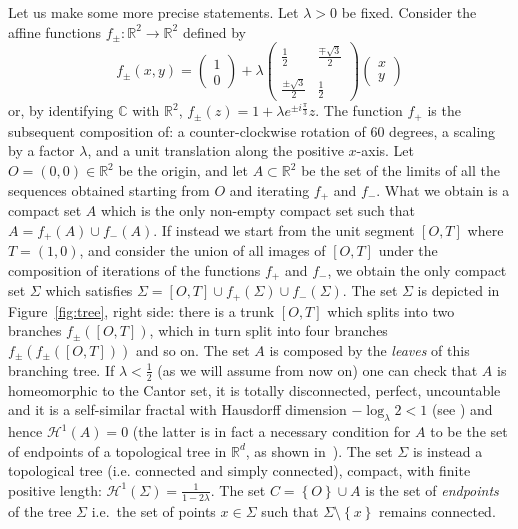 \documentclass{amsart}
\newcommand{\RR}{\mathbb R}
\newcommand{\CC}{\mathbb C}
\renewcommand{\H}{\mathcal H}
\newcommand{\ENCLOSE}[1]{\left\{#1\right\}}
\renewcommand{\H}{\mathcal{H}}
\theoremstyle{definition}
\theoremstyle{remark}
\begin{document}
Let us make some more precise statements.
Let $\lambda>0$ be fixed.
Consider the affine functions $f_\pm\colon \RR^2\to \RR^2$ defined by
\[
  f_\pm(x,y) = \begin{pmatrix} 1 \\ 0 \end{pmatrix} 
    + \lambda \begin{pmatrix} 
        \frac 1 2 & \frac{\mp\sqrt 3}{2} \\\\ 
        \frac{\pm\sqrt 3}{2} & \frac 1 2 
      \end{pmatrix} \begin{pmatrix} x \\ y \end{pmatrix}
\]
or, by identifying $\CC$ with $\RR^2$,
$f_\pm(z) = 1 + \lambda e^{\pm i \frac \pi 3} z$.
The function $f_+$ is the subsequent composition of: a counter-clockwise rotation of $60$ degrees,
a scaling by a factor $\lambda$, and a unit translation along the positive $x$-axis.
Let $O=(0,0)\in \RR^2$ be the origin, and let $A\subset \RR^2$ be the set of 
the limits of all the sequences obtained starting from $O$ and 
iterating $f_+$ and $f_-$.
What we obtain is a compact set $A$ which is the only non-empty compact set 
such that $A=f_+(A)\cup f_-(A)$.
If instead we start from the unit segment $[O,T]$ where $T=(1,0)$, and 
consider the union of all images of $[O,T]$ under the composition of iterations of the 
functions $f_+$ and $f_-$, we obtain the only compact set $\Sigma$ which satisfies 
$\Sigma=[O,T]\cup f_+(\Sigma)\cup f_-(\Sigma)$.
The set $\Sigma$ is depicted in Figure~\ref{fig:tree}, right side:
there is a trunk $[O,T]$ which splits into two branches $f_\pm([O,T])$, 
which in turn split into four branches $f_\pm(f_\pm([O,T]))$ and so on.
The set $A$ is composed by the \emph{leaves} of this branching tree.
If $\lambda < \frac 1 2$ (as we will assume from now on)
one can check that $A$ is 
homeomorphic to the Cantor set, it is totally disconnected, 
perfect, uncountable and it is a self-similar fractal with Hausdorff dimension
$-\log_\lambda 2<1$ (see \cite{Hut81}) and hence $\H^1(A)=0$
(the latter is in fact a necessary condition for $A$ to be the set of endpoints 
of a topological tree
in $\RR^d$, as shown in~\cite[proposition~3.3]{PaoSteTep15}).
The set $\Sigma$ is instead a topological tree (i.e.{} connected and simply connected), 
compact, with finite positive length: $\H^1(\Sigma) = \frac{1}{1-2\lambda}$.
The set $C=\ENCLOSE{O}\cup A$ is the set of \emph{endpoints} of the tree $\Sigma$ i.e.\ 
the set of points $x\in \Sigma$ such that $\Sigma\setminus\ENCLOSE{x}$ remains connected.
\end{document}
